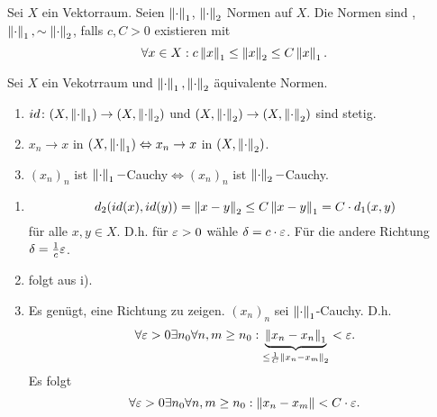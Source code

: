 \begin{definition}
	Sei $ X $ ein Vektorraum. Seien $ \left\|\cdot\right\|_1 $, $ \left\|\cdot\right\|_2 $ Normen auf $ X $. Die Normen sind , $ \left\|\cdot\right\|_1,\sim\left\|\cdot\right\|_2 $, falls $ c,C>0 $ existieren mit
	\[ \forall x\in X:c\left\|x\right\|_1\leq\left\|x\right\|_2\leq C\left\|x\right\|_1. \]
\end{definition}
\begin{satz}
	Sei $ X $ ein Vekotrraum und $ \left\|\cdot\right\|_1, \left\|\cdot\right\|_2 $ \"aquivalente Normen.
	\begin{enumerate}
		\item $ id\colon(X,\left\|\cdot\right\|_1)\rightarrow(X,\left\|\cdot\right\|_2) $ und $ (X,\left\|\cdot\right\|_2)\rightarrow(X,\left\|\cdot\right\|_2) $ sind stetig.
		\item $ x_n\to x $ in $ (X,\left\|\cdot\right\|_1)\Leftrightarrow x_n\to x $ in $ (X,\left\|\cdot\right\|_2) $.
		\item $ (x_n)_n $ ist $ \left\|\cdot\right\|_1- $Cauchy$ \Leftrightarrow (x_n)_n $ ist $ \left\|\cdot\right\|_2- $Cauchy.
	\end{enumerate}
\end{satz}
\begin{beweis}
	\begin{enumerate}
	\item \[ d_2(id(x),id(y))=\left\|x-y\right\|_2\leq C\left\|x-y\right\|_1=C\cdot d_1(x,y) \]
	f\"ur alle $ x,y\in X $. D.h. f\"ur $ \varepsilon>0 $ w\"ahle $ \delta=c\cdot\varepsilon $. F\"ur die andere Richtung $ \delta=\frac{1}{c}\varepsilon $.
	\item folgt aus i).
	\item Es gen\"ugt, eine Richtung zu zeigen. $ (x_n)_n $ sei $ \left\|\cdot\right\|_1 $-Cauchy. D.h.
	\[ \forall\varepsilon>0\exists n_0\forall n,m\geq n_0:\underbrace{\left\|x_n-x_n\right\|_1}_{\leq\frac{1}{C}\left\|x_n-x_m\right\|_2}<\varepsilon. \]
	Es folgt
	\[ \forall\varepsilon>0\exists n_0\forall n,m\geq n_0:\left\|x_n-x_m\right\|<C\cdot\varepsilon. \]
	\end{enumerate}
\end{beweis}
